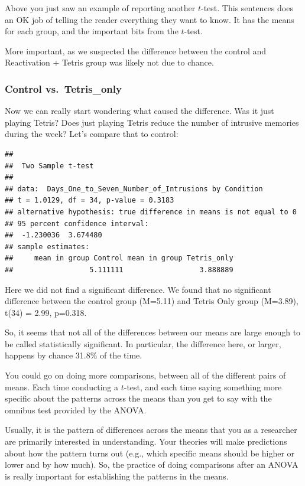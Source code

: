 \documentclass[]{book}
\begin{document}
Above you just saw an example of reporting another \(t\)-test. This sentences does an OK job of telling the reader everything they want to know. It has the means for each group, and the important bits from the \(t\)-test.

More important, as we suspected the difference between the control and Reactivation + Tetris group was likely not due to chance.

\hypertarget{control-vs.tetris_only}{%
\subsubsection{Control vs.~Tetris\_only}\label{control-vs.tetris_only}}

Now we can really start wondering what caused the difference. Was it just playing Tetris? Does just playing Tetris reduce the number of intrusive memories during the week? Let's compare that to control:

\begin{verbatim}
## 
## 	Two Sample t-test
## 
## data:  Days_One_to_Seven_Number_of_Intrusions by Condition
## t = 1.0129, df = 34, p-value = 0.3183
## alternative hypothesis: true difference in means is not equal to 0
## 95 percent confidence interval:
##  -1.230036  3.674480
## sample estimates:
##     mean in group Control mean in group Tetris_only 
##                  5.111111                  3.888889
\end{verbatim}

Here we did not find a significant difference. We found that no significant difference between the control group (M=5.11) and Tetris Only group (M=3.89), t(34) = 2.99, p=0.318.

So, it seems that not all of the differences between our means are large enough to be called statistically significant. In particular, the difference here, or larger, happens by chance 31.8\% of the time.

You could go on doing more comparisons, between all of the different pairs of means. Each time conducting a \(t\)-test, and each time saying something more specific about the patterns across the means than you get to say with the omnibus test provided by the ANOVA.

Usually, it is the pattern of differences across the means that you as a researcher are primarily interested in understanding. Your theories will make predictions about how the pattern turns out (e.g., which specific means should be higher or lower and by how much). So, the practice of doing comparisons after an ANOVA is really important for establishing the patterns in the means.
\end{document}
